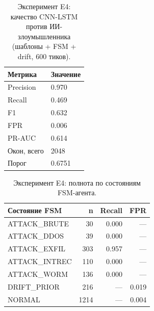 \begin{table}[H]
\centering
\caption{Эксперимент E4: качество CNN-LSTM против ИИ-злоумышленника (шаблоны + FSM + drift, 600 тиков).}
\label{tab:E4-overall}
\begin{tabular}{ll}
\toprule
\textbf{Метрика} & \textbf{Значение} \\
\midrule
Precision & 0.970 \\
Recall    & 0.469 \\
F1        & 0.632 \\
FPR       & 0.006 \\
PR-AUC    & 0.614 \\
Окон, всего & 2048 \\
Порог     & 0.6751 \\
\bottomrule
\end{tabular}
\end{table}

\begin{table}[H]
\centering
\caption{Эксперимент E4: полнота по состояниям FSM-агента.}
\label{tab:E4-per-state}
\renewcommand{\arraystretch}{1.15}
\begin{tabular}{lrrr}
\toprule
\textbf{Состояние FSM} & \textbf{n} & \textbf{Recall} & \textbf{FPR} \\
\midrule
ATTACK\_BRUTE & 30 & 0.000 & --- \\
ATTACK\_DDOS & 39 & 0.000 & --- \\
ATTACK\_EXFIL & 303 & 0.957 & --- \\
ATTACK\_INTREC & 110 & 0.000 & --- \\
ATTACK\_WORM & 136 & 0.000 & --- \\
DRIFT\_PRIOR & 216 & --- & 0.019 \\
NORMAL & 1214 & --- & 0.004 \\
\bottomrule
\end{tabular}
\end{table}